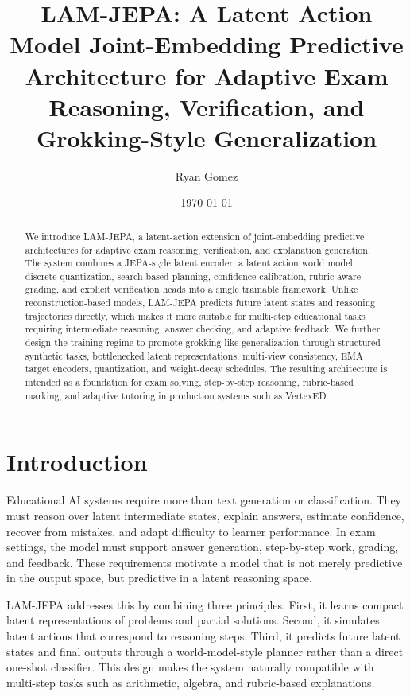 \documentclass[11pt]{article}
\title{LAM-JEPA: A Latent Action Model Joint-Embedding Predictive Architecture for Adaptive Exam Reasoning, Verification, and Grokking-Style Generalization}
\author{Ryan Gomez}
\date{\today}
\newcommand{\1}{\mathbbm{1}}
\begin{document}
\maketitle

\begin{abstract}
We introduce LAM-JEPA, a latent-action extension of joint-embedding predictive architectures for adaptive exam reasoning, verification, and explanation generation. The system combines a JEPA-style latent encoder, a latent action world model, discrete quantization, search-based planning, confidence calibration, rubric-aware grading, and explicit verification heads into a single trainable framework. Unlike reconstruction-based models, LAM-JEPA predicts future latent states and reasoning trajectories directly, which makes it more suitable for multi-step educational tasks requiring intermediate reasoning, answer checking, and adaptive feedback. We further design the training regime to promote grokking-like generalization through structured synthetic tasks, bottlenecked latent representations, multi-view consistency, EMA target encoders, quantization, and weight-decay schedules. The resulting architecture is intended as a foundation for exam solving, step-by-step reasoning, rubric-based marking, and adaptive tutoring in production systems such as VertexED.
\end{abstract}


\section{Introduction}
Educational AI systems require more than text generation or classification. They must reason over latent intermediate states, explain answers, estimate confidence, recover from mistakes, and adapt difficulty to learner performance. In exam settings, the model must support answer generation, step-by-step work, grading, and feedback. These requirements motivate a model that is not merely predictive in the output space, but predictive in a latent reasoning space.

LAM-JEPA addresses this by combining three principles. First, it learns compact latent representations of problems and partial solutions. Second, it simulates latent actions that correspond to reasoning steps. Third, it predicts future latent states and final outputs through a world-model-style planner rather than a direct one-shot classifier. This design makes the system naturally compatible with multi-step tasks such as arithmetic, algebra, and rubric-based explanations.
\end{document}
